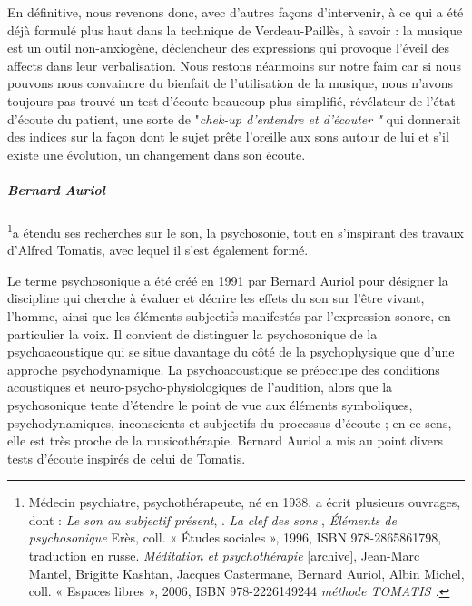 En définitive, nous revenons donc, avec d'autres façons d'intervenir,
à ce qui a été déjà formulé plus haut dans la technique de Verdeau-Paillès,
à savoir : la musique est un outil non-anxiogène, déclencheur des expressions qui provoque
l'éveil des affects dans  leur verbalisation. Nous restons néanmoins sur notre faim car si nous pouvons nous convaincre du bienfait de l'utilisation de la musique, nous n'avons toujours pas trouvé un test d'écoute beaucoup plus simplifié, révélateur de l'état d'écoute du patient, une sorte de "\textit{chek-up d'entendre et d'écouter "} qui donnerait des indices sur la façon dont le sujet prête l'oreille aux sons autour de lui et s'il existe une évolution, un changement dans son écoute.


\subparagraph{Bernard Auriol}\footnote{Médecin psychiatre, psychothérapeute, né en
  1938, a écrit plusieurs ouvrages, dont : \emph{Le son au subjectif
    présent}, \cite{auriol96sonausubjectifpresent}.
\emph{ La clef des sons} \cite{Auri96:clesons}, \emph{Éléments de
  psychosonique} Erès, coll. « Études sociales », 1996, ISBN
978-2865861798, traduction en russe. \emph{Méditation et
  psychothérapie} {[}archive{]}, Jean-Marc Mantel, Brigitte Kashtan,
Jacques Castermane, Bernard Auriol, Albin Michel, coll. « Espaces
libres », 2006, ISBN 978-2226149244\emph{ méthode TOMATIS :} }a étendu
ses recherches sur le son, la psychosonie, tout en s'inspirant des
travaux d'Alfred Tomatis, avec lequel il s'est également formé.

Le terme psychosonique a été créé en 1991 par Bernard Auriol pour
désigner la discipline qui cherche à évaluer et décrire les effets du
son sur l'être vivant, l'homme, ainsi que les éléments
subjectifs manifestés par l'expression sonore, en particulier la voix.
Il convient de distinguer la psychosonique de la psychoacoustique qui
se situe davantage du côté de la psychophysique que d'une approche
psychodynamique. La psychoacoustique se préoccupe des conditions
acoustiques et neuro-psycho-physiologiques de l'audition, alors que la
psychosonique tente d'étendre le point de vue aux éléments
symboliques, psychodynamiques, inconscients et subjectifs du processus
d'écoute ;  en ce sens, elle est très proche de la musicothérapie.
Bernard Auriol a mis au point divers tests d'écoute inspirés de celui de Tomatis.
  

